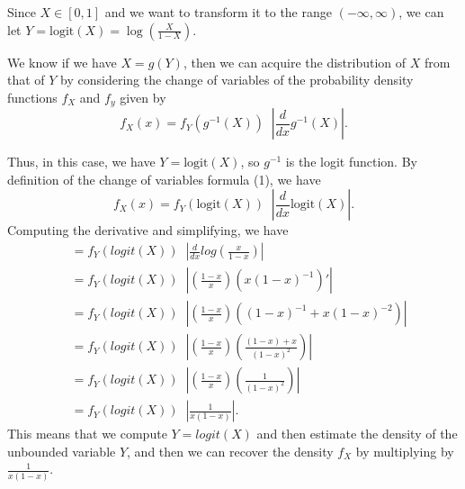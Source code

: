 \documentclass[12pt,twoside]{smiththesis}
\begin{document}
Since \(X \in [0,1]\) and we want to transform it to the range \((-\infty,\infty)\), we can let \(Y = \text{logit}(X) = \log \left( \frac{X}{1-X} \right)\).

We know if we have \(X = g(Y)\), then we can acquire the distribution of \(X\) from that of \(Y\) by considering the change of variables of the probability density functions \(f_X\) and \(f_y\) given by
\[f_X(x) = f_Y(g^{-1}(X)) \;\; \left| \frac{d}{dx} g^{-1}(X) \right|. \tag{1}\]

Thus, in this case, we have \(Y = \text{logit}(X)\), so \(g^{-1}\) is the logit function. By definition of the change of variables formula (1), we have
\[f_X(x) = f_Y(\text{logit}(X)) \;\; \left| \frac{d}{dx} \text{logit}(X) \right|.\]
Computing the derivative and simplifying, we have
\begin{align*} &= f_Y(logit(X)) \;\; \left| \frac{d}{dx}log(\frac{x}{1-x}) \right|\\
&= f_Y(logit(X)) \;\; \left| \left(\frac{1-x}{x} \right) (x(1-x)^{-1})' \right|\\ 
&= f_Y(logit(X)) \;\; \left| \left(\frac{1-x}{x} \right) ((1-x)^{-1} + x(1-x)^{-2} ) \right|\\
&= f_Y(logit(X)) \;\; \left| \left(\frac{1-x}{x} \right) \left(\frac{(1-x) + x }{ (1-x)^{2} }\right) \right|\\
&= f_Y(logit(X)) \;\; \left| \left(\frac{1-x}{x} \right) \left(\frac{1 }{ (1-x)^{2} }\right) \right|\\
&= f_Y(logit(X)) \;\; \left|  \frac{1 }{ x (1-x) } \right|.
\end{align*}
This means that we compute \(Y = logit(X)\) and then estimate the density of the unbounded variable \(Y\), and then we can recover the density \(f_X\) by multiplying by \(\frac{1 }{ x (1-x) }\).
\end{document}
